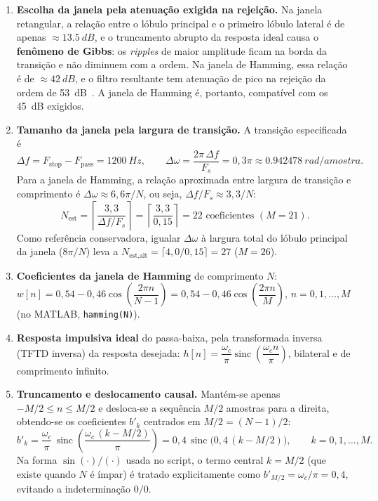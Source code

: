 \documentclass[11pt,a4paper]{article}
\newcommand{\sinc}{\operatorname{sinc}}
\begin{document}
\begin{enumerate}[leftmargin=1.6em, itemsep=2pt, topsep=3pt]
    \item \textbf{Escolha da janela pela atenuação exigida na rejeição.} Na janela retangular, a relação entre o lóbulo principal e o primeiro lóbulo lateral é de apenas $\approx\SI{13,5}{dB}$, e o truncamento abrupto da resposta ideal causa o \textbf{fenômeno de Gibbs}: os \textit{ripples} de maior amplitude ficam na borda da transição e não diminuem com a ordem. Na janela de Hamming, essa relação é de $\approx\SI{42}{dB}$, e o filtro resultante tem atenuação de pico na rejeição da ordem de \SI{53}{dB}~\cite{oppenheim2010}. A janela de Hamming é, portanto, compatível com os \SI{45}{dB} exigidos.

    \item \textbf{Tamanho da janela pela largura de transição.} A transição especificada é
    \begin{equation}
        \Delta f = F_{\text{stop}} - F_{\text{pass}} = \SI{1200}{Hz}, \qquad \Delta\omega = \frac{2\pi\,\Delta f}{F_s} = 0,3\pi \approx \SI{0,942478}{rad/amostra}.
    \end{equation}
    Para a janela de Hamming, a relação aproximada entre largura de transição e comprimento é $\Delta\omega \approx 6,6\pi/N$, ou seja, $\Delta f/F_s \approx 3,3/N$:
    \begin{equation}
        N_{\text{est}} = \left\lceil \frac{3,3}{\Delta f / F_s} \right\rceil = \left\lceil \frac{3,3}{0,15} \right\rceil = 22 \text{ coeficientes } (M = 21).
    \end{equation}
    Como referência conservadora, igualar $\Delta\omega$ à largura total do lóbulo principal da janela ($8\pi/N$) leva a $N_{\text{est,alt}} = \lceil 4,0/0,15 \rceil = 27$ ($M = 26$).

    \item \textbf{Coeficientes da janela de Hamming} de comprimento $N$: $w[n] = 0,54 - 0,46\cos\!\left(\dfrac{2\pi n}{N-1}\right) = 0,54 - 0,46\cos\!\left(\dfrac{2\pi n}{M}\right)$, $n = 0, 1, \dots, M$ (no MATLAB, \texttt{hamming(N)}).

    \item \textbf{Resposta impulsiva ideal} do passa-baixa, pela transformada inversa (TFTD inversa) da resposta desejada: $h[n] = \dfrac{\omega_c}{\pi}\sinc\!\left(\dfrac{\omega_c n}{\pi}\right)$, bilateral e de comprimento infinito.

    \item[5--6.] \textbf{Truncamento e deslocamento causal.} Mantém-se apenas $-M/2 \le n \le M/2$ e desloca-se a sequência $M/2$ amostras para a direita, obtendo-se os coeficientes $b'_k$ centrados em $M/2 = (N-1)/2$:
    \begin{equation}
        b'_k = \frac{\omega_c}{\pi}\,\sinc\!\left(\frac{\omega_c\,(k - M/2)}{\pi}\right) = 0,4\,\sinc\big(0,4\,(k - M/2)\big), \qquad k = 0, 1, \dots, M.
        \label{eq:hideal}
    \end{equation}
    Na forma $\sin(\cdot)/(\cdot)$ usada no script, o termo central $k = M/2$ (que existe quando $N$ é ímpar) é tratado explicitamente como $b'_{M/2} = \omega_c/\pi = 0,4$, evitando a indeterminação $0/0$.


\end{enumerate}
\end{document}
